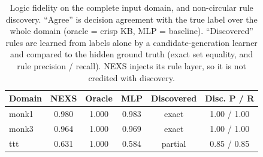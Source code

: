 \begin{table}[t]\centering\small
\caption{Logic fidelity on the complete input domain, and non-circular rule discovery. ``Agree'' is decision agreement with the true label over the whole domain (oracle = crisp KB, MLP = baseline). ``Discovered'' rules are learned from labels alone by a candidate-generation learner and compared to the hidden ground truth (exact set equality, and rule precision / recall). NEXS injects its rule layer, so it is not credited with discovery.}
\label{tab:structural}
\begin{tabular}{lccccc}
\toprule
Domain & NEXS & Oracle & MLP & Discovered & Disc. P / R \\
\midrule
monk1 & 0.980 & 1.000 & 0.983 & exact & 1.00 / 1.00 \\
monk3 & 0.964 & 1.000 & 0.969 & exact & 1.00 / 1.00 \\
ttt & 0.631 & 1.000 & 0.584 & partial & 0.85 / 0.85 \\
\end{tabular}
\end{table}
